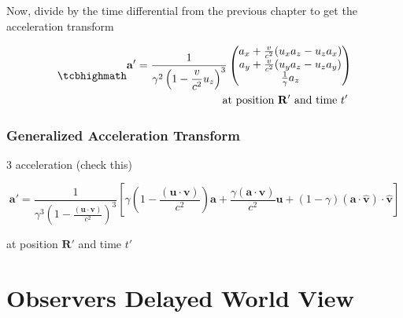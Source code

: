 Now, divide by the time differential from the previous chapter to get the acceleration transform

\begin{equation}
	\mhl{
		\begin{aligned}
			\mathbf{a}{'} = \dfrac{1}{{\gamma}^2\left(1- \dfrac{v}{c^2} {{u}_{z}}\right)^3 }
			\begin{pmatrix}
				{{a}_{x}} + \frac{v}{c^2}({{u}_{x}} {{a}_{z}} - {{u}_{z}} {{a}_{x}}) \\
				{{a}_{y}} + \frac{v}{c^2}({{u}_{y}} {{a}_{z}} - {{u}_{z}} {{a}_{y}}) \\
				\frac{1}{{\gamma}} {{a}_{z}}                 \\
			\end{pmatrix}
			\\
			\text{at position $\mathbf{R}{'}$ and time $t{'}$ }
		\end{aligned}
	}
\end{equation}

\subsection{Generalized Acceleration Transform}

3 acceleration (check this)

\begin{equation}
	\mathbf{a{'}} = \frac{1}{{\gamma} ^3 \left(1-\frac{(\mathbf{u}\cdot \mathbf{v})}{c^2}\right)^3}\left[ {\gamma} \left(1-\frac{(\mathbf{u}\cdot\mathbf{v})}{c^2}\right)\mathbf{a}+\frac{{\gamma} (\mathbf{a}\cdot\mathbf{v})}{c^2}\mathbf{u} + (1-{\gamma} ) (\mathbf{a}\cdot\hat{\mathbf{v}}) \cdot\hat{\mathbf{v}}\right]
\end{equation}

at position $\mathbf{R}{'}$ and time $t{'}$



\chapter{Observers Delayed World View}


